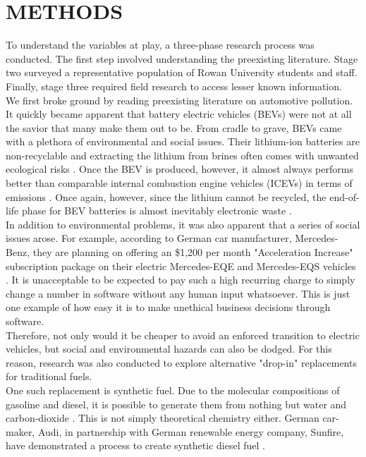 \documentclass[man]{apa7}
\begin{document}
\section{METHODS}
	To understand the variables at play, a three-phase research process was conducted. The first step involved understanding the preexisting literature. Stage two surveyed a representative population of Rowan University students and staff. Finally, stage three required field research to access lesser known information.
	\\
	We first broke ground by reading preexisting literature on automotive pollution. It quickly became apparent that battery electric vehicles (BEVs) were not at all the savior that many make them out to be. From cradle to grave, BEVs came with a plethora of environmental and social issues. Their lithium-ion batteries are non-recyclable and extracting the lithium from brines often comes with unwanted ecological risks \citep{Flexer2018}. Once the BEV is produced, however, it almost always performs better than comparable internal combustion engine vehicles (ICEVs) in terms of emissions \citep{Franzo2020}. Once again, however, since the lithium cannot be recycled, the end-of-life phase for BEV batteries is almost inevitably electronic waste \citep{Flexer2018}.
	\\
	In addition to environmental problems, it was also apparent that a series of social issues arose. For example, according to German car manufacturer, Mercedes-Benz, they are planning on offering an \$1,200 per month "Acceleration Increase" subscription package on their electric Mercedes-EQE and Mercedes-EQS vehicles \citep{Mercedes2022}. It is unacceptable to be expected to pay such a high recurring charge to simply change a number in software without any human input whatsoever. This is just one example of how easy it is to make unethical business decisions through software.
	\\
	Therefore, not only would it be cheaper to avoid an enforced transition to electric vehicles, but social and environmental hazards can also be dodged. For this reason, research was also conducted to explore alternative "drop-in" replacements for traditional fuels.
	\\
	One such replacement is synthetic fuel. Due to the molecular compositions of gasoline and diesel, it is possible to generate them from nothing but water and carbon-dioxide \citep{Simakov2017}. This is not simply theoretical chemistry either. German car-maker, Audi, in partnership with German renewable energy company, Sunfire, have demonstrated a process to create synthetic diesel fuel \citep{Ferris2017}.
\end{document}
